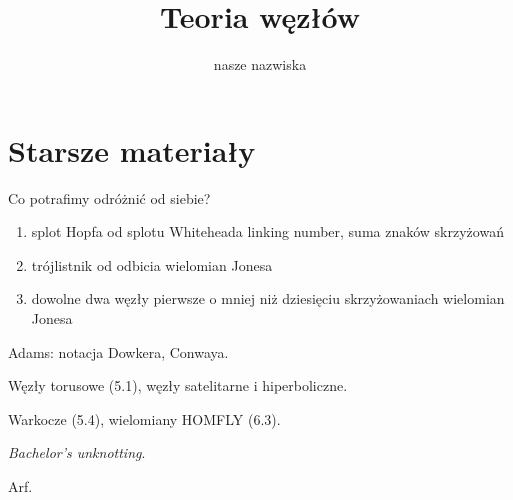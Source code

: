 \documentclass[a4paper, fleqn]{extarticle}
\title{Teoria węzłów}
\author{nasze nazwiska}
\numberwithin{dummy}{section}
\begin{document}
\maketitle
\tableofcontents





%







\newpage

\raggedright

\section*{Starsze materiały}

Co potrafimy odróżnić od siebie?
\begin{enumerate}
\item splot Hopfa od splotu Whiteheada \dotfill linking number, suma znaków skrzyżowań
\item trójlistnik od odbicia \dotfill wielomian Jonesa
\item dowolne dwa węzły pierwsze o mniej niż dziesięciu skrzyżowaniach \dotfill  wielomian Jonesa
\end{enumerate}

Adams: notacja Dowkera, Conwaya.

Węzły torusowe (5.1), węzły satelitarne i hiperboliczne.

Warkocze (5.4), wielomiany HOMFLY (6.3).

\emph{Bachelor's unknotting}.

Arf.
\end{document}
